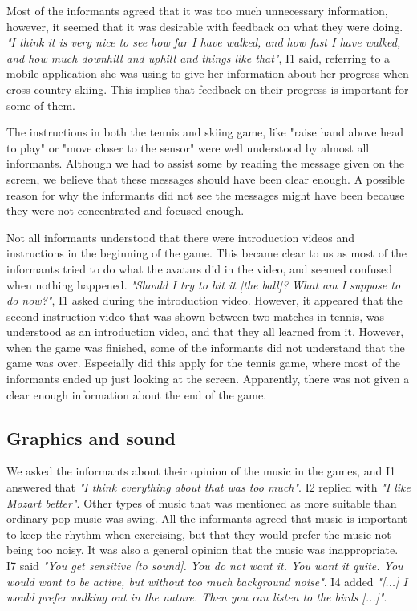 Most of the informants agreed that it was too much unnecessary information, however, it seemed that it was desirable with feedback on what they were doing. \emph{"I think it is very nice to see how far I have walked, and how fast I have walked, and how much downhill and uphill and things like that"}, I1 said, referring to a mobile application she was using to give her information about her progress when cross-country skiing. This implies that feedback on their progress is important for some of them.  

The instructions in both the tennis and skiing game, like "raise hand above head to play" or "move closer to the sensor" were well understood by almost all informants. Although we had to assist some by reading the message given on the screen, we believe that these messages should have been clear enough. A possible reason for why the informants did not see the messages might have been because they were not concentrated and focused enough. 

Not all informants understood that there were introduction videos and instructions in the beginning of the game. This became clear to us as most of the informants tried to do what the avatars did in the video, and seemed confused when nothing happened. \emph{"Should I try to hit it [the ball]? What am I suppose to do now?"}, I1 asked during the introduction video. However, it appeared that the second instruction video that was shown between two matches in tennis, was understood as an introduction video, and that they all learned from it. However, when the game was finished, some of the informants did not understand that the game was over. Especially did this apply for the tennis game, where most of the informants ended up just looking at the screen. Apparently, there was not given a clear enough information about the end of the game.  

\subsection{Graphics and sound}

We asked the informants about their opinion of the music in the games, and I1 answered that \emph{"I think everything about that was too much"}. I2 replied with \emph{"I like Mozart better"}. Other types of music that was mentioned as more suitable than ordinary pop music was swing. All the informants agreed that music is important to keep the rhythm when exercising, but that they would prefer the music not being too noisy. It was also a general opinion that the music was inappropriate.  I7 said \emph{"You get sensitive [to sound]. You do not want it. You want it quite. You would want to be active, but without too much background noise"}. I4 added \emph{"[...] I would prefer walking out in the nature. Then you can listen to the birds [...]"}.

